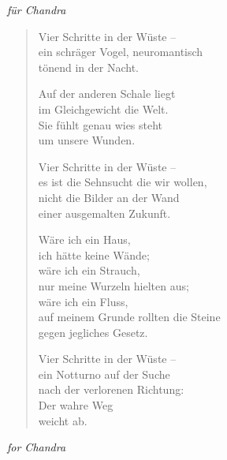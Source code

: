 
\cleartorecto


\hspace{2em}\emph{für Chandra}

\begin{verse}
Vier Schritte in der Wüste --\\
ein schräger Vogel, neuromantisch\\
tönend in der Nacht.

Auf der anderen Schale liegt\\
im Gleichgewicht die Welt.\\
Sie fühlt genau wies steht\\
um unsere Wunden.

Vier Schritte in der Wüste --\\
es ist die Sehnsucht die wir wollen,\\
nicht die Bilder an der Wand\\
einer ausgemalten Zukunft.

Wäre ich ein Haus,\\
ich hätte keine Wände;\\
wäre ich ein Strauch,\\
nur meine Wurzeln hielten aus;\\
wäre ich ein Fluss,\\
auf meinem Grunde rollten die Steine\\
gegen jegliches Gesetz.

Vier Schritte in der Wüste --\\
ein Notturno auf der Suche\\
nach der verlorenen Richtung:\\
Der wahre Weg\\
weicht ab.
\end{verse}

\cleartoverso


\hspace{2em}\emph{for Chandra}

